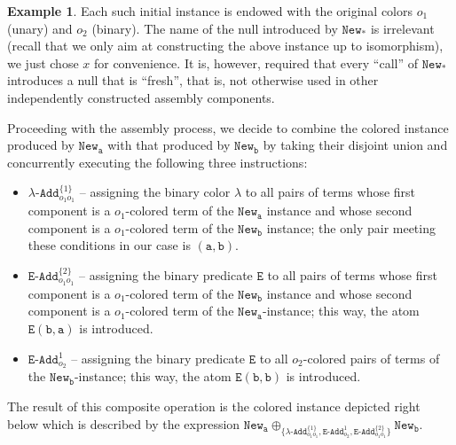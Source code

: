 \documentclass[10pt,a4paper]{amsart}
\theoremstyle{definition}
\newtheorem{exa}[exa]{Example}
\numberwithin{equation}{section}
\theoremstyle{plain}
\theoremstyle{definition}
\newtheorem{example}[example]{Example}
\theoremstyle{myexample}
\renewenvironment{example}%
{
	\begin{shaded*}	
		\vspace{-1.5ex}
		\begin{exa}%
		}{
		\end{exa}
		\vspace{-1.5ex}
	\end{shaded*}
}
\theoremstyle{plain}
\theoremstyle{definition}
\newcommand{\origcol}{o}
\newcommand{\newconst}[1]{\pred{New}_{\const{#1}}} %
\newcommand{\newanon}{\pred{New}_{\const{*}}} %
\newcommand{\cadd}[4]{#4\pred{\texttt{-}Add}^{#3}_{#1#2}} %
\newcommand{\radd}[4]{#4\pred{\texttt{-}Add}^{#3}_{#1#2}}
\newcommand{\unradd}[2]{#2\pred{\texttt{-}Add}_{#1}}
\newcommand{\pred}[1]{\mathtt{#1}}
\newcommand{\const}[1]{\mathtt{#1}}
\newcommand{\epred}{\pred{E}}
\begin{document}
\begin{example}
Each such initial instance is endowed with the original colors $o_1$ (unary) and $o_2$ (binary). %
The name of the null introduced by $\newanon$ is irrelevant (recall that we only aim at constructing the above instance up to isomorphism), we just chose $x$ for convenience. It is, however, required that every ``call'' of $\newanon$ introduces a null that is ``fresh'', that is, not otherwise used in other independently constructed assembly components. 


Proceeding with the assembly process, we decide to combine the colored instance produced by $\newconst{a}$ with that produced by $\newconst{b}$ by taking their disjoint union and concurrently executing the following three instructions:
\begin{itemize}
\item $\cadd{\origcol_1}{\origcol_1}{\{1\}}{\lambda}$ -- assigning the binary color $\lambda$ to all pairs of terms whose first component is a $o_1$-colored term of the $\newconst{a}$ instance and whose second component  is a $o_1$-colored term of the $\newconst{b}$ instance; the only pair meeting these conditions in our case is $(\const{a},\const{b})$.
\item $\radd{\origcol_1}{\origcol_1}{\{2\}}{\epred}$ -- assigning the binary predicate $\pred{E}$ to all pairs of terms whose first component is a $o_1$-colored term of the $\newconst{b}$ instance and whose second component  is a $o_1$-colored term of the $\newconst{a}$-instance; this way, the atom $\pred{E}(\const{b},\const{a})$ is introduced.
\item $\unradd{\origcol_{2}}{\epred}^{1}$ -- assigning the binary predicate $\pred{E}$ to all $o_2$-colored pairs of terms of the $\newconst{b}$-instance; this way, the atom $\pred{E}(\const{b},\const{b})$ is introduced.
\end{itemize}
%
The result of this composite operation is the colored instance depicted right below which is described by the expression  $\newconst{a} \oplus_{\{ 	\cadd{\origcol_1}{\origcol_1}{\{1\}}{\lambda},
	\unradd{\origcol_{2}}{\epred}^{1}, 
	\radd{\origcol_1}{\origcol_1}{\{2\}}{\epred} \}} \newconst{b}$.\\[-0ex] 

\begin{center}
\begin{tikzpicture}[level/.style={sibling distance=60mm/#1, level distance=15mm}]
		

\end{tikzpicture}
\end{center}
\end{example}
\end{document}
